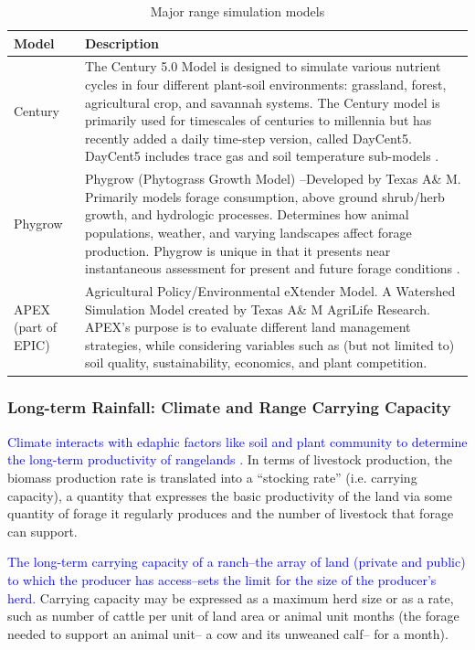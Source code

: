 \documentclass[11pt]{article}
\begin{document}
\begin{table}[htb!]
\begin{tabularx}{\textwidth}{|l|X|}
\hline
Model & Description \\
\hline
Century & The Century 5.0 Model is designed to simulate various nutrient cycles in four different plant-soil environments: grassland, forest, agricultural crop, and savannah systems. The Century model is primarily used for timescales of centuries to millennia but has recently added a daily time-step version, called DayCent5. DayCent5 includes trace gas and soil temperature sub-models \citep{Cerri2004}. \\
\hline
Phygrow & Phygrow (Phytograss Growth Model) –Developed by Texas A\& M. Primarily models forage consumption, above ground shrub/herb growth, and hydrologic processes. Determines how animal populations, weather, and varying landscapes affect forage production. Phygrow is unique in that it presents near instantaneous assessment for present and future forage conditions \citep{Souza2001}. \\
\hline
APEX (part of EPIC) & Agricultural Policy/Environmental eXtender Model. A Watershed Simulation Model created by Texas A\& M AgriLife Research. APEX’s purpose is to evaluate different land management strategies, while considering variables such as (but not limited to) soil quality, sustainability, economics, and plant competition. \\
\hline
\end{tabularx} 
\label{range_models}
\caption{Major range simulation models}
\end{table}
\clearpage



\subsubsection{Long-term Rainfall: Climate and Range Carrying Capacity}
\textcolor{blue}{Climate interacts with edaphic factors like soil and plant community to determine the long-term productivity of rangelands \citep{Holechek2010}.} In terms of livestock production, the biomass production rate is translated into a ``stocking rate'' (i.e. carrying capacity), a quantity that expresses the basic productivity of the land via some quantity of forage it regularly produces and the number of livestock that forage can support.

\textcolor{blue}{The long-term carrying capacity of a ranch--the array of land (private and public) to which the producer has access--sets the limit for the size of the producer's herd.} 
Carrying capacity may be expressed as a maximum herd size or as a rate, such as number of cattle per unit of land area or animal unit months (the forage needed to support an animal unit-- a cow and its unweaned calf-- for a month).
\end{document}
